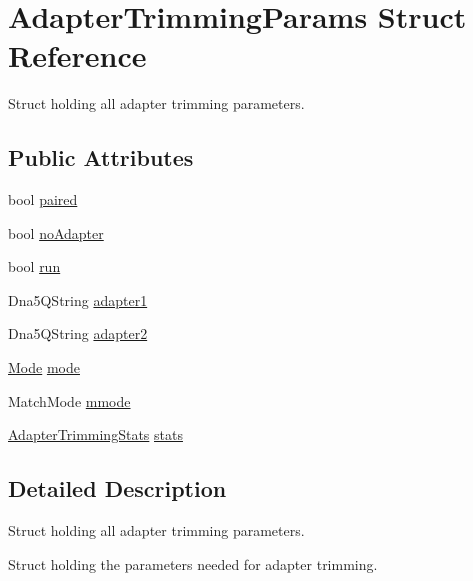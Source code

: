 \hypertarget{struct_adapter_trimming_params}{\section{Adapter\-Trimming\-Params Struct Reference}
\label{struct_adapter_trimming_params}
}


Struct holding all adapter trimming parameters.  


\subsection*{Public Attributes}
\begin{DoxyCompactItemize}
\item 
bool \hyperlink{struct_adapter_trimming_params_a9c442bd3226e26f0becce6eba5f40359}{paired}
\item 
bool \hyperlink{struct_adapter_trimming_params_a8386f1819859d97bb58011903f5dd847}{no\-Adapter}
\item 
bool \hyperlink{struct_adapter_trimming_params_a61f37e8fe2d242947cfd358b85a0380e}{run}
\item 
Dna5\-Q\-String \hyperlink{struct_adapter_trimming_params_a2ce2d426a36e328f4fceb715910db488}{adapter1}
\item 
Dna5\-Q\-String \hyperlink{struct_adapter_trimming_params_aa7d555b99c145cd062e7caa12f4161ab}{adapter2}
\item 
\hyperlink{struct_mode}{Mode} \hyperlink{struct_adapter_trimming_params_a9e78ea3942b231eccb2243a70953c560}{mode}
\item 
Match\-Mode \hyperlink{struct_adapter_trimming_params_ae69ec37f149e6b9234746ae275c5ff3e}{mmode}
\item 
\hyperlink{struct_adapter_trimming_stats}{Adapter\-Trimming\-Stats} \hyperlink{struct_adapter_trimming_params_a557d501f056a0ba2ae35560ed8d72a9d}{stats}
\end{DoxyCompactItemize}


\subsection{Detailed Description}
Struct holding all adapter trimming parameters. 

Struct holding the parameters needed for adapter trimming. 

